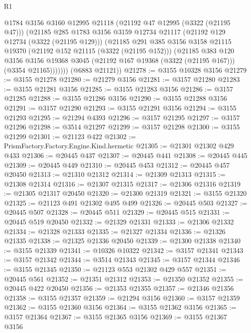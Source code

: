 \begin{lexlean}{R1}
\begin{coremodule}
            @1784
            @3156
            @3160
            @12995
            @21118
            (@21192 @47 @12995 (@3322 (@21195 @47)))
            (@21185
              @285
              @1783
              @3156
              @3159
              @12734
              @21117
              (@21192 @129 @12734 (@3322 (@21195 @129)))
              (@21185
                @291
                @385
                @3156
                @3158
                @21115
                @19370
                (@21192 @152 @21115 (@3322 (@21195 @152)))
                (@21185
                  @383
                  @120
                  @3156
                  @3156
                  @19368
                  @3045
                  (@21192 @167 @19368 (@3322 (@21195 @167)))
                  (@3354 @21165)))))))
      (@6883 @21121))
@21278 := @3155 @10328 @3156
@21279 := @3155 @21278
@21280 := @21279 @3156
@21281 := @3157 @21280
@21283 := @3155 @21281 @3156
@21285 := @3155 @21283 @3156
@21286 := @3157 @21285
@21288 := @3155 @21286 @3156
@21290 := @3155 @21288 @3156
@21291 := @3157 @21290
@21293 := @3155 @21291 @3156
@21294 := @3155 @21293
@21295 := @21294 @4393
@21296 := @3157 @21295
@21297 := @3157 @21296
@21298 := @3514 @21297
@21299 := @3157 @21298
@21300 := @3155 @21299
@21301 := @21123 @422
@21302 := PrismFactory.Factory.Engine.Kind.hermetic
@21305 := @21301 @21302 @429 @433
@21306 := @20445 @437
@21307 := @20445 @441
@21308 := @20445 @445
@21309 := @20445 @449
@21310 := @20445 @453
@21312 := @20445 @457 @20450
@21313 := @21310 @21312
@21314 := @21309 @21313
@21315 := @21308 @21314
@21316 := @21307 @21315
@21317 := @21306 @21316
@21319 := @21305 @21317 @20450
@21320 := @21300 @21319
@21321 := @3155 @21320
@21325 := @21123 @491 @21302 @495 @499
@21326 := @20445 @503
@21327 := @20445 @507
@21328 := @20445 @511
@21329 := @20445 @515
@21331 := @20445 @519 @20450
@21332 := @21329 @21331
@21333 := @21306 @21332
@21334 := @21328 @21333
@21335 := @21327 @21334
@21336 := @21326 @21335
@21338 := @21325 @21336 @20450
@21339 := @21300 @21338
@21340 := @3155 @21339
@21341 := @10326 @10322
@21342 := @3157 @21341
@21343 := @3157 @21342
@21344 := @3514 @21343
@21345 := @3157 @21344
@21346 := @3155 @21345
@21350 := @21123 @553 @21302 @429 @557
@21351 := @20445 @561
@21352 := @21351 @21312
@21353 := @21350 @21352
@21355 := @20445 @422 @20450
@21356 := @21353 @21355
@21357 := @21346 @21356
@21358 := @3155 @21357
@21359 := @21294 @3156
@21360 := @3157 @21359
@21362 := @3155 @21360 @3156
@21364 := @3155 @21362 @3156
@21365 := @3157 @21364
@21367 := @3155 @21365 @3156
@21369 := @3155 @21367 @3156

\end{coremodule}
\end{lexlean}
